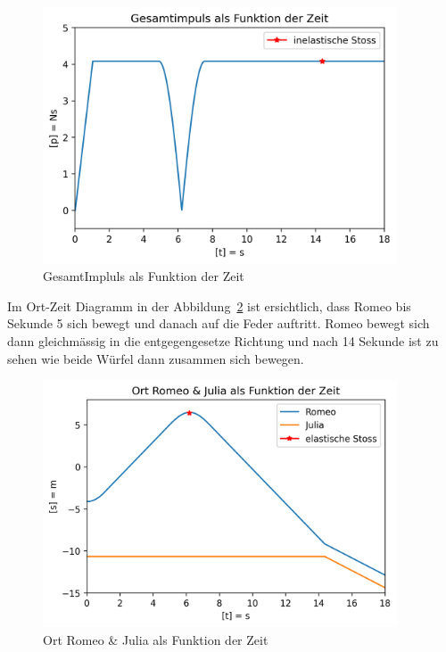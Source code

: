 \documentclass[../main.tex]{subfiles}
\begin{document}
    \begin{figure}[H]
        \begin{center}
            \centerline{\includegraphics[width=105mm]{./images/Inelastisch/GesamtImpluls}}
            \caption{GesamtImpluls als Funktion der Zeit}
            \label{fig:gesamtImpuls}
        \end{center}
    \end{figure}

    Im Ort-Zeit Diagramm in der Abbildung~\ref{fig:OrtRomeoJuliaAlsFunktionDerZeit} ist ersichtlich, dass Romeo bis Sekunde 5 sich bewegt und danach auf die Feder auftritt. Romeo bewegt sich dann gleichmässig in die entgegengesetze Richtung und nach 14 Sekunde ist zu sehen wie beide Würfel dann zusammen sich bewegen. 
    \begin{figure}[H]
        \begin{center}
            \centerline{\includegraphics[width=105mm]{./images/Inelastisch/OrtRomeoJuliaAlsFunktionDerZeit}}
            \caption{Ort Romeo \& Julia als Funktion der Zeit}
            \label{fig:OrtRomeoJuliaAlsFunktionDerZeit}
        \end{center}
    \end{figure}
\end{document}
